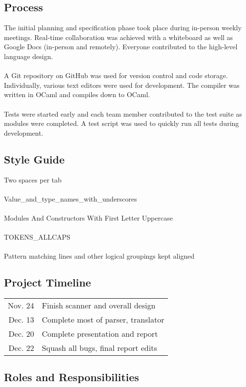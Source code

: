 
\subsection{Process}

The initial planning and specification phase took place during in-person weekly meetings. Real-time collaboration was achieved with a whiteboard as well as Google Docs (in-person and remotely). Everyone contributed to the high-level language design.\\\\
A Git repository on GitHub was used for version control and code storage. Individually, various text editors were used for development. The compiler was written in OCaml and compiles down to OCaml.\\\\
Tests were started early and each team member contributed to the test suite as modules were completed. A test script was used to quickly run all tests during development.

\subsection{Style Guide}

Two spaces per tab\\\\
Value\_and\_type\_names\_with\_underscores\\\\
Modules And Constructors With First Letter Uppercase\\\\
TOKENS\_ALLCAPS\\\\
Pattern matching lines and other logical groupings kept aligned

\subsection{Project Timeline}

\begin{tabular}{r l}
Nov. 24 & Finish scanner and overall design\\
Dec. 13 & Complete most of parser, translator\\
Dec. 20 & Complete presentation and report\\
Dec. 22 & Squash all bugs, final report edits\\
\end{tabular}

\subsection{Roles and Responsibilities}

